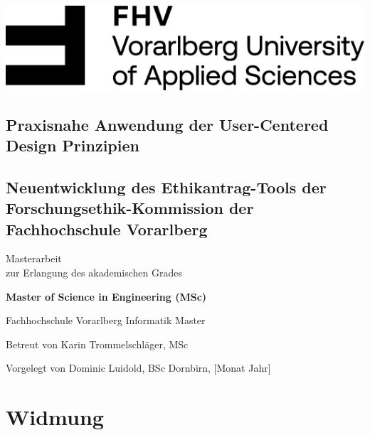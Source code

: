 \begin{titlepage}
    \begin{flushright}
    \includegraphics[width=0.4\linewidth]{images/FHV_FHV-Logo.png}
    \end{flushright}
    \vspace{1cm}

    \begin{flushleft}
    \section*{Praxisnahe Anwendung der User-Centered Design Prinzipien}
    \subsection*{Neuentwicklung des Ethikantrag-Tools der Forschungsethik-Kommission der Fachhochschule Vorarlberg}
    \vspace{1cm}

    Masterarbeit\\
    zur Erlangung des akademischen Grades
    \vspace{0.5cm}

    \textbf{Master of Science in Engineering (MSc)}

    \vspace{1cm}
    Fachhochschule Vorarlberg\newline
    Informatik Master

    \vspace{0.5cm}

    Betreut von\newline
    Karin Trommelschläger, MSc

    \vspace{0.5cm}

    Vorgelegt von\newline
    Dominic Luidold, BSc\newline
    Dornbirn, [Monat Jahr]
    \end{flushleft}
\end{titlepage}

\newpage
\section*{Widmung}
\label{sec:widmung}


